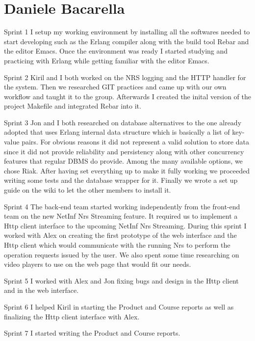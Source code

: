 \section{Daniele Bacarella}

Sprint 1
I setup my working environment by installing all the softwares needed to start developing such as the Erlang compiler along with the build tool Rebar and the editor Emacs.
Once the environment was ready I started studying and practicing with Erlang while getting familiar with the editor Emacs.

Sprint 2
Kiril and I both worked on the NRS logging and the HTTP handler for the system. Then we researched GIT practices and came up with our own workflow and taught it to the group.
Afterwards I created the inital version of the project Makefile and integrated Rebar into it.

Sprint 3
Jon and I both researched on database alternatives to the one already adopted that uses Erlang internal data structure which is basically a list of key-value pairs. For obvious reasons it did not represent a valid solution to store data since it did not provide reliability and persistency along with other concurrency features that regular DBMS do provide.
Among the many available options, we chose Riak.
After having set everything up to make it fully working we proceeded writing some tests and the database wrapper for it.
Finally we wrote a set up guide on the wiki to let the other members to install it. 

Sprint 4
The back-end team started working independently from the front-end team on the new NetInf Nrs Streaming feature.
It required us to implement a Http client interface to the upcoming NetInf Nrs Streaming.
During this sprint I worked with Alex on creating the first prototype of the web interface and the Http client which would communicate with the running Nrs to perform the operation requests issued by the user.
We also spent some time researching on video players to use on the web page that would fit our needs.

Sprint 5
I worked with Alex and Jon fixing bugs and design in the Http client and in the web interface.

Sprint 6
I helped Kiril in starting the Product and Course reports as well as finalizing the Http client interface with Alex.

Sprint 7
I started writing the Product and Course reports.